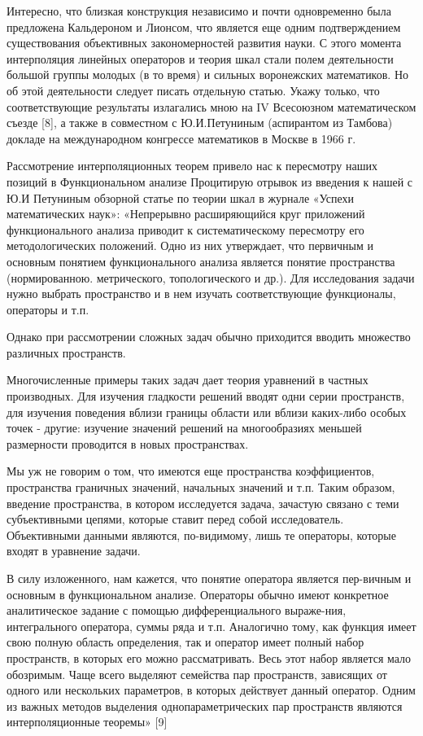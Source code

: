 Интересно, что близкая конструкция независимо и почти одновременно была предложена Кальдероном и Лионсом, что является еще одним подтверждением существования объективных закономерностей развития науки. С этого момента интерполяция линейных операторов и теория шкал стали полем деятельности большой группы молодых (в то время) и сильных воронежских математиков. Но об этой деятельности следует писать отдельную статью. Укажу только, что соответствующие результаты излагались мною на IV Всесоюзном математическом съезде [8], а также в совместном с Ю.И.Петуниным (аспирантом из Тамбова) докладе на международном конгрессе математиков в Москве в 1966 г.

Рассмотрение интерполяционных теорем привело нас к пересмотру наших позиций в Функциональном анализе Процитирую отрывок из введения к нашей с Ю.И Петуниным обзорной статье по теории шкал в журнале «Успехи математических наук»: «Непрерывно расширяющийся круг приложений функционального анализа приводит к систематическому пересмотру его методологических положений. Одно из них утверждает, что первичным и основным понятием функционального анализа является понятие пространства (нормированною. метрического, топологического и др.). Для исследования задачи нужно выбрать пространство и в нем изучать соответствующие функционалы, операторы и т.п.

Однако при рассмотрении сложных задач обычно приходится вводить множество различных пространств.

Многочисленные примеры таких задач дает теория уравнений в частных производных. Для изучения гладкости решений вводят одни серии пространств, для изучения поведения вблизи границы области или вблизи каких-либо особых точек - другие: изучение значений решений на многообразиях меньшей размерности проводится в новых пространствах.

Мы уж не говорим о том, что имеются еще пространства коэффициентов, пространства граничных значений, начальных значений и т.п. Таким образом, введение пространства, в котором исследуется задача, зачастую связано с теми субъективными цепями, которые ставит перед собой исследователь. Объективными данными являются, по-видимому, лишь те операторы, которые входят в уравнение задачи.

В силу изложенного, нам кажется, что понятие оператора является пер-вичным и основным в функциональном анализе. Операторы обычно имеют конкретное аналитическое задание с помощью дифференциального выраже-ния, интегрального оператора, суммы ряда и т.п. Аналогично тому, как функция имеет свою полную область определения, так и оператор имеет полный набор пространств, в которых его можно рассматривать. Весь этот набор является мало обозримым. Чаще всего выделяют семейства пар пространств, зависящих от одного или нескольких параметров, в которых действует данный оператор. Одним из важных методов выделения однопараметрических пар пространств являются интерполяционные теоремы» [9]

